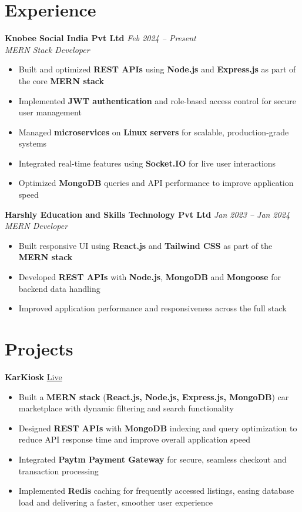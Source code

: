 \documentclass[letterpaper,10pt]{article}
\begin{document}
\section{Experience}

\textbf{Knobee Social India Pvt Ltd} \hfill \textit{Feb 2024 -- Present} \\
\textit{MERN Stack Developer}
\begin{itemize}
\item Built and optimized \textbf{REST APIs} using \textbf{Node.js} and \textbf{Express.js} as part of the core \textbf{MERN stack}
\item Implemented \textbf{JWT authentication} and role-based access control for secure user management
\item Managed \textbf{microservices} on \textbf{Linux servers} for scalable, production-grade systems
\item Integrated real-time features using \textbf{Socket.IO} for live user interactions
\item Optimized \textbf{MongoDB} queries and API performance to improve application speed
\end{itemize}

\vspace{1pt}
\textbf{Harshly Education and Skills Technology Pvt Ltd} \hfill \textit{Jan 2023 -- Jan 2024} \\
\textit{MERN Developer}
\begin{itemize}
\item Built responsive UI using \textbf{React.js} and \textbf{Tailwind CSS} as part of the \textbf{MERN stack}
\item Developed \textbf{REST APIs} with \textbf{Node.js}, \textbf{MongoDB} and \textbf{Mongoose} for backend data handling
\item Improved application performance and responsiveness across the full stack
\end{itemize}

\section{Projects}

\textbf{KarKiosk} \hfill \href{https://karkiosk.com/}{Live}
\begin{itemize}
\item Built a \textbf{MERN stack} (\textbf{React.js, Node.js, Express.js, MongoDB}) car marketplace with dynamic filtering and search functionality
\item Designed \textbf{REST APIs} with \textbf{MongoDB} indexing and query optimization to reduce API response time and improve overall application speed
\item Integrated \textbf{Paytm Payment Gateway} for secure, seamless checkout and transaction processing
\item Implemented \textbf{Redis} caching for frequently accessed listings, easing database load and delivering a faster, smoother user experience
\end{itemize}
\end{document}
